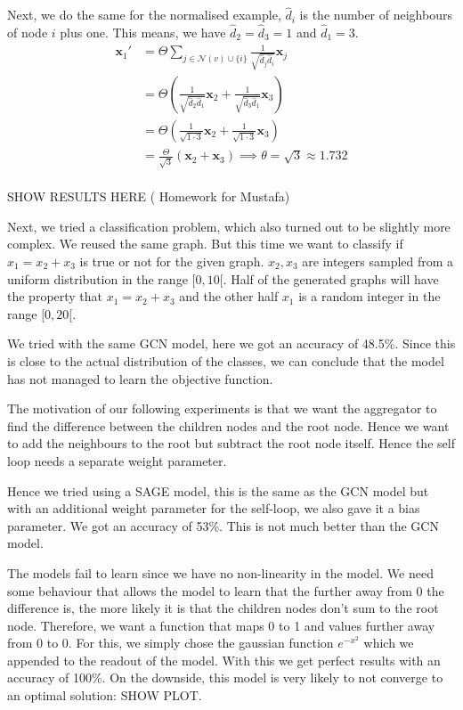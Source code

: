 \documentclass[a4paper,12pt]{article}
\begin{document}
Next, we do the same for the normalised example, \(\hat{d}_{i}\) is the number of neighbours of node \(i\) plus one. This means, we have \(\hat{d}_{2} = \hat{d}_{3} = 1\) and \(\hat{d}_{1}=3\).
\begin{align}
  \mathbf{x}_1' &= \Theta \sum_{j \in \mathcal{N}(v) \cup \{i\}} \frac{1}{\sqrt{\hat{d}_j \hat{d}_i}} \mathbf{x}_j\\
  &= \Theta  \left( \frac{1}{\sqrt{\hat{d}_2 \hat{d}_1}} \mathbf{x}_2 +  \frac{1}{\sqrt{\hat{d}_3 \hat{d}_1}} \mathbf{x}_3 \right)\\
  &= \Theta  \left( \frac{1}{\sqrt{1 \cdot 3}} \mathbf{x}_2 +  \frac{1}{\sqrt{1 \cdot 3}} \mathbf{x}_3 \right)\\
  &= \frac{\Theta}{\sqrt{3}}  \left(  \mathbf{x}_2 +   \mathbf{x}_3 \right) \implies \theta = \sqrt{3} \approx 1.732\\
\end{align}

SHOW RESULTS HERE (
Homework for Mustafa)

Next, we tried a classification problem, which also turned out to be slightly more complex. We reused the same graph. But this time we want to classify if \(x_{1} = x_{2}+x_{3}\) is true or not for the given graph. \(x_2, x_3\) are integers sampled from a uniform distribution in the range \([0, 10[\). Half of the generated graphs will have the property that \(x_{1} = x_{2}+x_{3}\) and the other half \(x_1\) is a random integer in the range \([0, 20[\).

We tried with the same GCN model, here we got an accuracy of 48.5\%. Since this is close to the actual distribution of the classes, we can conclude that the model has not managed to learn the objective function.

The motivation of our following experiments is that we want the aggregator to find the difference between the children nodes and the root node. Hence we want to add the neighbours to the root but subtract the root node itself. Hence the self loop needs a separate weight parameter.

Hence we tried using a SAGE model, this is the same as the GCN model but with
an additional weight parameter for the self-loop, we also gave it a bias parameter. We got an accuracy of 53\%. %
This is not much better than the GCN model.

The models fail to learn since we have no non-linearity in the model. We need some behaviour
that allows the model to learn that the further away from 0 the difference is,
the more likely it is that the children nodes don't sum to the root node.
Therefore, we want a function that maps 0 to 1 and values further away from 0 to 0. 
For this, we simply chose the gaussian function \(e^{-x^2}\) which we
appended to the readout of the model. With this we get perfect results with an
accuracy of 100\%. On the downside, this model is very likely to not converge to an optimal solution: SHOW PLOT.
\end{document}
